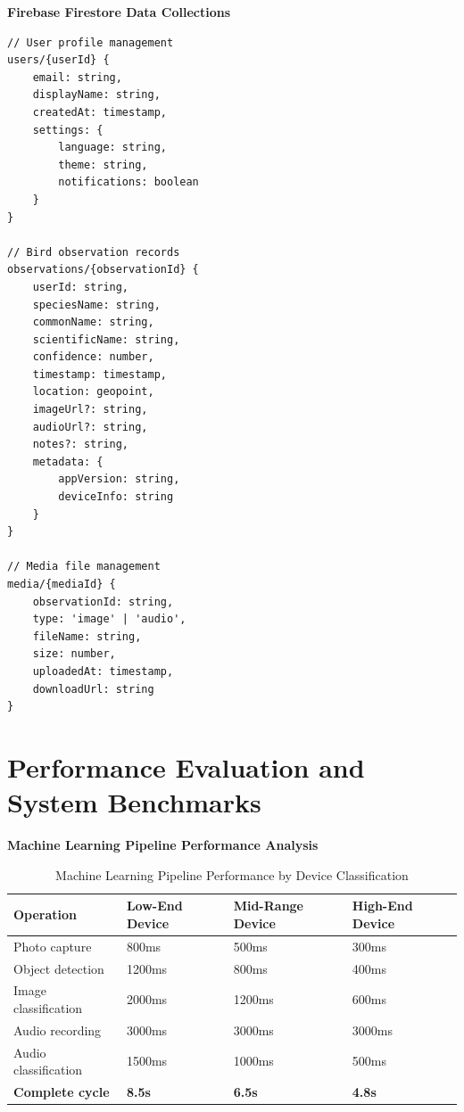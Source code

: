 \textbf{Firebase Firestore Data Collections}
\begin{lstlisting}[caption=Firestore Collections, label=lst:firestore_collections]
// User profile management
users/{userId} {
    email: string,
    displayName: string,
    createdAt: timestamp,
    settings: {
        language: string,
        theme: string,
        notifications: boolean
    }
}

// Bird observation records
observations/{observationId} {
    userId: string,
    speciesName: string,
    commonName: string,
    scientificName: string,
    confidence: number,
    timestamp: timestamp,
    location: geopoint,
    imageUrl?: string,
    audioUrl?: string,
    notes?: string,
    metadata: {
        appVersion: string,
        deviceInfo: string
    }
}

// Media file management
media/{mediaId} {
    observationId: string,
    type: 'image' | 'audio',
    fileName: string,
    size: number,
    uploadedAt: timestamp,
    downloadUrl: string
}
\end{lstlisting}

\section{Performance Evaluation and System Benchmarks}

\textbf{Machine Learning Pipeline Performance Analysis}
\begin{table}[H]
\centering
\begin{tabular}{|l|l|l|l|}
\hline
\textbf{Operation} & \textbf{Low-End Device} & \textbf{Mid-Range Device} & \textbf{High-End Device} \\
\hline
Photo capture & 800ms & 500ms & 300ms \\
Object detection & 1200ms & 800ms & 400ms \\
Image classification & 2000ms & 1200ms & 600ms \\
Audio recording & 3000ms & 3000ms & 3000ms \\
Audio classification & 1500ms & 1000ms & 500ms \\
\textbf{Complete cycle} & \textbf{8.5s} & \textbf{6.5s} & \textbf{4.8s} \\
\hline
\end{tabular}
\caption{Machine Learning Pipeline Performance by Device Classification}
\label{tab:ml_performance}
\end{table}

